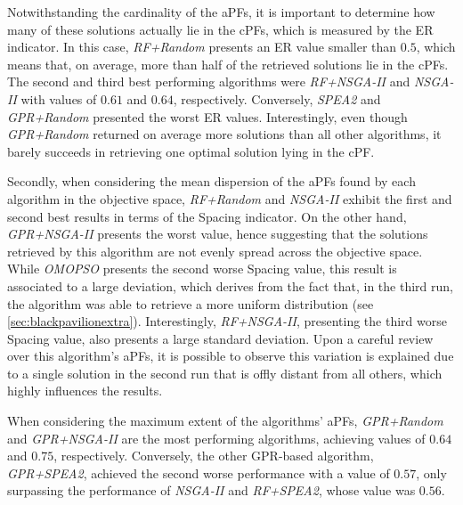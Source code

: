 Notwithstanding the cardinality of the \acp{aPF}, it is important to determine how many of these solutions actually lie in the \acp{cPF}, which is measured by the \ac{ER} indicator. In this case, \textit{RF+Random} presents an \ac{ER} value smaller than $0.5$, which means that, on average, more than half of the retrieved solutions lie in the \acp{cPF}. The second and third best performing algorithms were \textit{RF+NSGA-II} and \textit{NSGA-II} with values of $0.61$ and $0.64$, respectively. Conversely, \textit{SPEA2} and \textit{GPR+Random} presented the worst \ac{ER} values. Interestingly, even though \textit{GPR+Random} returned on average more solutions than all other algorithms, it barely succeeds in retrieving one optimal solution lying in the \ac{cPF}.

Secondly, when considering the mean dispersion of the \acp{aPF} found by each algorithm in the objective space, \textit{RF+Random} and \textit{NSGA-II} exhibit the first and second best results in terms of the Spacing indicator. On the other hand, \textit{GPR+NSGA-II} presents the worst value, hence suggesting that the solutions retrieved by this algorithm are not evenly spread across the objective space. While \textit{OMOPSO} presents the second worse Spacing value, this result is associated to a large deviation, which derives from the fact that, in the third run, the algorithm was able to retrieve a more uniform distribution (see \cref{sec:blackpavilionextra}). Interestingly, \textit{RF+NSGA-II}, presenting the third worse Spacing value, also presents a large standard deviation. Upon a careful review over this algorithm's \acp{aPF}, it is possible to observe this variation is explained due to a single solution in the second run that is offly distant from all others, which highly influences the results. 

When considering the maximum extent of the algorithms' \acp{aPF}, \textit{GPR+Random} and \textit{GPR+NSGA-II} are the most performing algorithms, achieving values of $0.64$ and $0.75$, respectively. Conversely, the other \ac{GPR}-based algorithm, \textit{GPR+SPEA2}, achieved the second worse performance with a value of $0.57$, only surpassing the performance of \textit{NSGA-II} and \textit{RF+SPEA2}, whose value was $0.56$. 

